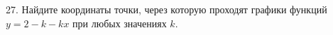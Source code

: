 27. Найдите координаты точки, через которую проходят графики функций $y=2-k-kx$ при любых значениях $k.$\\
